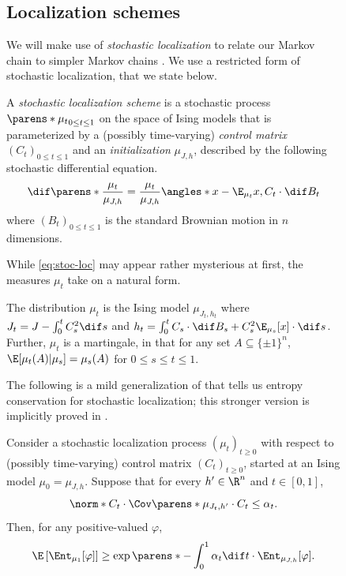 \documentclass[11pt,letterpaper]{article}
\begin{document}
\begin{figure}
\subsection{Localization schemes}   \label{sec:loc-schemes}

    We will make use of \emph{stochastic localization} to relate our Markov chain to simpler Markov chains \cite{Eld13,CE22}.
    We use a restricted form of stochastic localization, that we state below.
    \begin{definition}    \label{def:stoc-loc}
        A \emph{stochastic localization scheme} is a stochastic process $\parens*{\mu_{t}}_{0\le t\le 1}$ on the space of Ising models that is parameterized by a (possibly time-varying) \emph{control matrix} $(C_t)_{0 \le t \le 1}$ and an \emph{initialization} $\mu_{J,h}$, described by the following stochastic differential equation.
        \begin{equation}
            \dif\parens*{\frac{\mu_{t}}{\mu_{J,h}}} = \frac{\mu_{t}}{\mu_{J,h}} \angles*{ x-\E_{\mu_{t}} x, C_t \cdot \dif B_t } \label{eq:stoc-loc}
        \end{equation}
        where $(B_t)_{0\le t\le 1}$ is the standard Brownian motion in $n$ dimensions.
    \end{definition}
    While \eqref{eq:stoc-loc} may appear rather mysterious at first, the measures $\mu_{t}$ take on a natural form.
    \begin{fact}    \label{fact:stoc-loc-form}
        The distribution $\mu_t$ is the Ising model
        \(
            \mu_{J_t, h_t}
        \)
        where $J_t = J - \int_{0}^{t} C_s^2 \dif s$ and $h_t = \int_0^t C_s \cdot \dif B_s + C_s^2 \E_{\mu_s} [x] \cdot \dif s$.
        Further, $\mu_t$ is a martingale, in that for any set $A \subseteq \{\pm 1\}^n$, $\E[\mu_t(A)|\mu_s] = \mu_s(A)$ for $0\le s\le t\le 1$.
    \end{fact}

    The following is a mild generalization of \cite[Proposition 39 and Lemma 40]{CE22} that tells us entropy conservation for stochastic localization; this stronger version is implicitly proved in \cite[Lemma 40]{CE22}. 
    \begin{lemma}   \label{lem:entropic-stability}
        Consider a stochastic localization process $(\mu_t)_{t \ge 0}$ with respect to (possibly time-varying) control matrix $(C_t)_{t \ge 0}$, started at an Ising model $\mu_0 = \mu_{J,h}$. Suppose that for every $h'\in\R^n$ and $t \in [0,1]$,
        \[
            \norm*{C_t \cdot \Cov\parens*{\mu_{J_t, h'}} \cdot C_t} \le \alpha_t.
        \]
        Then, for any positive-valued $\varphi$,
        \[
            \E \left[\Ent_{\mu_{1}}[\varphi]\right] \ge \exp\parens*{-\int_{0}^{1} \alpha_t \dif t} \cdot \Ent_{\mu_{J,h}}[\varphi].
        \]
    \end{lemma}


\end{figure}
\end{document}

